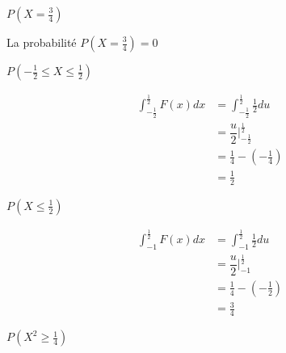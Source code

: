 \begin{exo}
	\begin{subexo}{$P(X = \frac{3}{4})$}
		\begin{center}
			La probabilité $P(X = \frac{3}{4}) = 0$
		\end{center}
	\end{subexo}
	\begin{subexo}{$P(-\frac{1}{2} \leq X \leq \frac{1}{2})$}
		\begin{flushleft}
			\begin{align*}
			\displaystyle\int_{-\frac{1}{2}}^{\frac{1}{2}}{F(x)}dx &=\int_{-\frac{1}{2}}^{\frac{1}{2}}{\frac{1}{2}}du\\
				&= \dfrac{u}{2}\bigg\vert_{-\frac{1}{2}}^{\frac{1}{2}}\\
				&= \frac{1}{4}-(-\frac{1}{4}) \\
				&= \frac{1}{2}
			\end{align*}
		\end{flushleft}
	\end{subexo}
	\begin{subexo}{$P(X \leq \frac{1}{2})$}
		\begin{flushleft}
			\begin{align*}
				\displaystyle\int_{-1}^{\frac{1}{2}}{F(x)}dx &=\int_{-1}^{\frac{1}{2}}{\frac{1}{2}}du\\
				&= \dfrac{u}{2}\bigg\vert_{-1}^{\frac{1}{2}}\\
				&= \frac{1}{4}-(-\frac{1}{2}) \\
				&= \frac{3}{4}
			\end{align*}
		\end{flushleft}
	\end{subexo}
	\begin{subexo}{$P(X^{2} \geq \frac{1}{4})$}
\end{subexo}
\end{exo}
